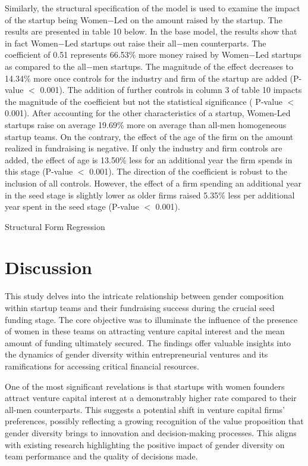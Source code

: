 Similarly, the structural specification of the model is used to examine the impact of the startup being Women$-$Led on the amount raised by the startup. The results are presented in table 10 below. In the base model, the results show that in fact Women$-$Led startups out raise their all$-$men counterparts. The coefficient of 0.51 represents 66.53\% more money raised by Women$-$Led startups as compared to the all$-$men startups. The magnitude of the effect decreases to 14.34\% more once controls for the industry and firm of the startup are added (P-value $<$ 0.001). The addition of further controls in column 3 of table 10 impacts the magnitude of the coefficient but not the statistical significance ( P-value $<$ 0.001). After accounting for the other characteristics of a startup, Women-Led startups raise on average 19.69\% more on average than all-men homogeneous startup teams. On the contrary, the effect of the age of the firm on the amount realized in fundraising is negative. If only the industry and firm controls are added, the effect of age is 13.50\% less for an additional year the firm spends in this stage (P-value $<$ 0.001). The direction of the coefficient is robust to the inclusion of all controls. However, the effect of a firm spending an additional year in the seed stage is slightly lower as older firms raised 5.35\% less per additional year spent in the seed stage (P-value $<$ 0.001). 

\begin{table}[H]
 \captionsetup{justification=raggedright,singlelinecheck=false}
    \caption{Structural Form Regression}
        
\end{table}


\section{Discussion}

This study delves into the intricate relationship between gender composition within startup teams and their fundraising success during the crucial seed funding stage. The core objective was to illuminate the influence of the presence of women in these teams on attracting venture capital interest and the mean amount of funding ultimately secured. The findings offer valuable insights into the dynamics of gender diversity within entrepreneurial ventures and its ramifications for accessing critical financial resources.

One of the most significant revelations is that startups with women founders attract venture capital interest at a demonstrably higher rate compared to their all-men counterparts. This suggests a potential shift in venture capital firms' preferences, possibly reflecting a growing recognition of the value proposition that gender diversity brings to innovation and decision-making processes. This aligns with existing research highlighting the positive impact of gender diversity on team performance and the quality of decisions made.

